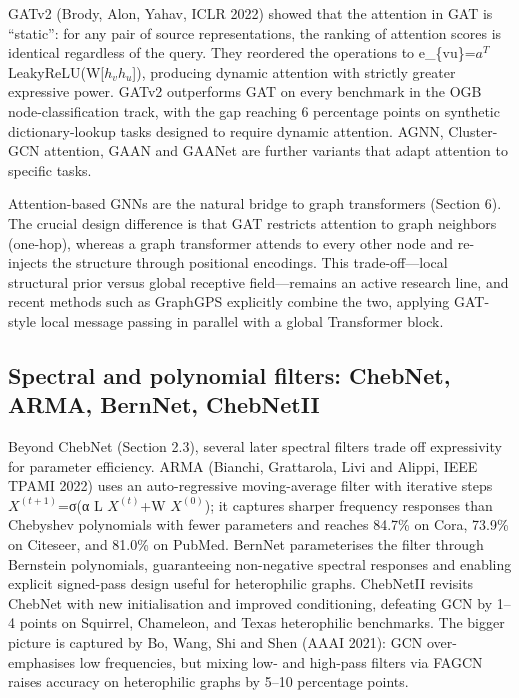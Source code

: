 \documentclass{article}
\begin{document}
GATv2 (Brody, Alon, Yahav, ICLR 2022) showed that the attention in GAT is ``static'': for any pair of source representations, the ranking of attention scores is identical regardless of the query. They reordered the operations to e\_\{vu\}=\(a^T\) LeakyReLU(W{[}\(h_v\)\textbar\textbar{}\(h_u\){]}), producing dynamic attention with strictly greater expressive power. GATv2 outperforms GAT on every benchmark in the OGB node-classification track, with the gap reaching 6 percentage points on synthetic dictionary-lookup tasks designed to require dynamic attention. AGNN, Cluster-GCN attention, GAAN and GAANet are further variants that adapt attention to specific tasks.

Attention-based GNNs are the natural bridge to graph transformers (Section 6). The crucial design difference is that GAT restricts attention to graph neighbors (one-hop), whereas a graph transformer attends to every other node and re-injects the structure through positional encodings. This trade-off---local structural prior versus global receptive field---remains an active research line, and recent methods such as GraphGPS \citep{rampek2022recipeforageneralp} explicitly combine the two, applying GAT-style local message passing in parallel with a global Transformer block.

\subsection{Spectral and polynomial filters: ChebNet, ARMA, BernNet, ChebNetII}\label{spectral-and-polynomial-filters-chebnet-arma-bernnet-chebnetii}

Beyond ChebNet (Section 2.3), several later spectral filters trade off expressivity for parameter efficiency. ARMA (Bianchi, Grattarola, Livi and Alippi, IEEE TPAMI 2022) uses an auto-regressive moving-average filter with iterative steps \(X^{(t+1)}\)=σ(α L \(X^{(t)}\)+W \(X^{(0)}\)); it captures sharper frequency responses than Chebyshev polynomials with fewer parameters and reaches 84.7\% on Cora, 73.9\% on Citeseer, and 81.0\% on PubMed. BernNet \citep{he2020lightgcnsimplifyin} parameterises the filter through Bernstein polynomials, guaranteeing non-negative spectral responses and enabling explicit signed-pass design useful for heterophilic graphs. ChebNetII revisits ChebNet with new initialisation and improved conditioning, defeating GCN by 1--4 points on Squirrel, Chameleon, and Texas heterophilic benchmarks. The bigger picture is captured by Bo, Wang, Shi and Shen (AAAI 2021): GCN over-emphasises low frequencies, but mixing low- and high-pass filters via FAGCN raises accuracy on heterophilic graphs by 5--10 percentage points.
\end{document}
